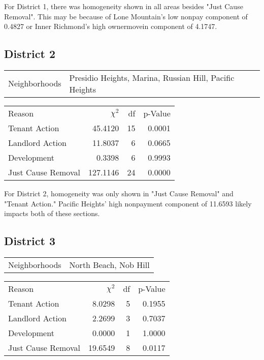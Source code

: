 \documentclass[]{article}
\begin{document}
For District 1, there was homogeneity shown in all areas besides "Just Cause Removal". This may be because of Lone Mountain's low nonpay component of 0.4827 or Inner Richmond's high ownermovein component of 4.1747.

\newpage
\subsection{District 2}
\begin{table}[!h]
	\centering
	\begin{tabular}{l | l}
		Neighborhoods & Presidio Heights, Marina, Russian Hill, Pacific Heights \\
	\end{tabular}
\end{table}
\FloatBarrier

\begin {table}[!h]
\centering
\begin{tabular}{l | r | r | r}
	
	Reason	&  $\chi ^{2}$ & df & p-Value \\
	Tenant Action 		 & 45.4120 &  15   & 0.0001 		\\
	Landlord Action	     & 11.8037 &  6     &  	0.0665	\\
	Development			 & 0.3398 &  6    &  0.9993		\\
	Just Cause Removal	 & 127.1146   &  24 &  	0.0000		\\
\end{tabular} \newline
\end{table}
\FloatBarrier

For District 2, homogeneity was only shown in "Just Cause Removal" and "Tenant Action." Pacific Heights' high nonpayment component of 11.6593 likely impacts both of these sections.

\subsection{District 3}

\begin{table}[!h]
	\centering
	\begin{tabular}{l | l}
		Neighborhoods & North Beach, Nob Hill \\
	\end{tabular}
\end{table}
\FloatBarrier

\begin {table}[!h]
\centering
\begin{tabular}{l | r | r | r}
	
	Reason	&  $\chi ^{2}$ & df & p-Value \\
	Tenant Action 		  & 8.0298 &  5  &  0.1955    \\
	Landlord Action	      & 2.2699 &  3  &  0.7037    \\
	Development			  & 0.0000 &  1  &  1.0000    \\
	Just Cause Removal	  & 19.6549 &  8  &  0.0117    \\
\end{tabular} \newline
\end{table}
\FloatBarrier
\end{document}
